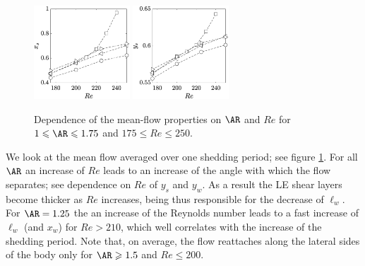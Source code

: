 \begin{figure}
  \includegraphics[width=0.32\textwidth]{./fig/AR1s/xs.eps}
  \includegraphics[width=0.32\textwidth]{./fig/AR1s/ys.eps}
  \caption{Dependence of the mean-flow properties on $\AR$ and $Re$ for $1 \le \AR \le 1.75$ and $175 \le Re \le 250$.}
  \label{fig:mf_lengths}
\end{figure}
%
We look at the mean flow averaged over one shedding period; see figure \ref{fig:mf_lengths}. For all $\AR$ an increase of $Re$ leads to an increase of the angle with which the flow separates; see dependence on $Re$ of $y_s$ and $y_w$. As a result the LE shear layers become thicker as $Re$ increases, being thus responsible for the decrease of $\ell_w$. For $\AR=1.25$ the an increase of the Reynolds number leads to a fast increase of $\ell_w$ (and $x_w$) for $Re>210$, which well correlates with the increase of the shedding period. Note that, on average, the flow reattaches along the lateral sides of the body only for $\AR \ge 1.5$ and $Re \le 200$.
% 
